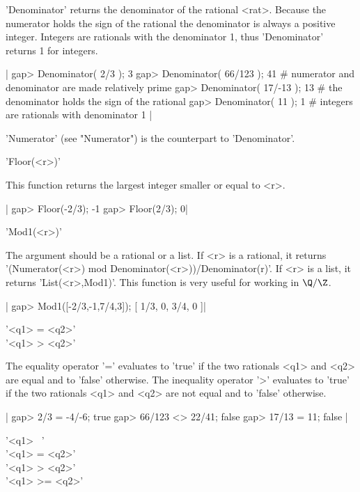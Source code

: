 'Denominator' returns the denominator of the rational <rat>.  Because the
numerator  holds the  sign of  the rational  the denominator  is always a
positive integer.   Integers are rationals  with  the denominator 1, thus
'Denominator' returns 1 for integers.

|    gap> Denominator( 2/3 );
    3
    gap> Denominator( 66/123 );
    41    # numerator and denominator are made relatively prime
    gap> Denominator( 17/-13 );
    13    # the denominator holds the sign of the rational
    gap> Denominator( 11 );
    1    # integers are rationals with denominator 1 |

'Numerator' (see "Numerator") is the counterpart to 'Denominator'.


'Floor(<r>)'

This function returns the largest integer smaller or equal to <r>.

|    gap> Floor(-2/3);
    -1
    gap> Floor(2/3);
    0|


'Mod1(<r>)'

The  argument should  be a  rational or  a list.  If <r>  is a rational, it
returns '(Numerator(<r>) mod Denominator(<r>))/Denominator(r)'. If <r> is a
list, it returns 'List(<r>,Mod1)'. This function is very useful for working
in $\Q/\Z$.

|    gap> Mod1([-2/3,-1,7/4,3]);
    [ 1/3, 0, 3/4, 0 ]|

%

'<q1> = <q2>' \\
'<q1> \<> <q2>'

The  equality operator '=' evaluates to  'true' if the two rationals <q1>
and <q2> are  equal  and to 'false'  otherwise.  The  inequality operator
'\<>' evaluates to   'true' if the  two rationals  <q1> and  <q2> are not
equal and to 'false' otherwise.

|    gap> 2/3 = -4/-6;
    true
    gap> 66/123 <> 22/41;
    false
    gap> 17/13 = 11;
    false |

'<q1> \<\ <q2>' \\
'<q1> \<= <q2>' \\
'<q1> > <q2>'   \\
'<q1> >= <q2>'


